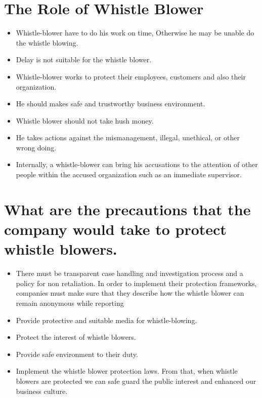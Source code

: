 \documentclass[12pt,a4paper,oneside]{article}
\begin{document}
\newpage

 
\section{The Role of Whistle Blower}

\begin{itemize}
\item Whistle-blower have to do his work on time, Otherwise he may be unable do the whistle blowing. 
\item Delay is not suitable for the whistle blower.
\item Whistle-blower works to protect their employees, customers and also their organization.
\item He should makes safe and trustworthy business environment.
\item Whistle blower should not take hush money.
\item He takes actions against the mismanagement, illegal, unethical, or other wrong doing.
\item Internally, a whistle-blower can bring his accusations to the attention of other people within the accused organization such as an immediate supervisor.
\end{itemize}


\section{What are the precautions that the company would take to protect whistle blowers.}

\begin{itemize}
\item There must be transparent case handling and investigation process and a policy for non retaliation. In order to implement their protection frameworks, companies must make sure that they describe how the whistle blower can remain anonymous while reporting
\item Provide protective and suitable media for whistle-blowing.
\item Protect the interest of whistle blowers.
\item Provide safe environment to their duty.
\item Implement the whistle blower protection laws. From that, when whistle blowers are protected we can safe guard the public interest and enhanced our business culture.
\end{itemize}



\clearpage
\end{document}
